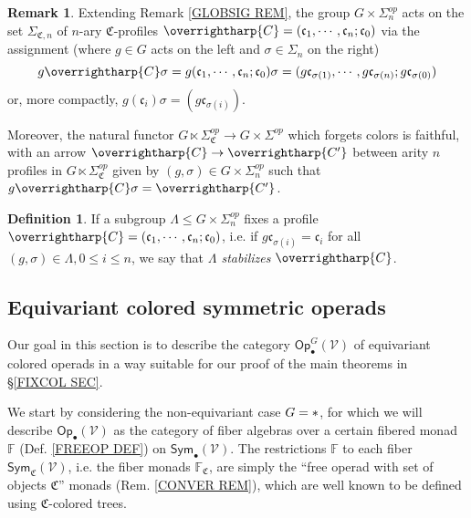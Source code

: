 \documentclass[a4paper,10pt
]{article}%
\numberwithin{equation}{section}
\numberwithin{figure}{section}
\theoremstyle{definition} %
\newtheorem{definition}[equation]{Definition}%
\newtheorem{remark}[equation]{Remark}%
\newcommand{\vect}[1]{\text{\overrightharp{\ensuremath{#1}}}}
\newcommand{\V}{\ensuremath{\mathcal V}}
\newcommand{\1}{\ensuremath{\mathbbm 1}}%
\begin{document}
\begin{remark}\label{SIGACT REM}
	Extending Remark \ref{GLOBSIG REM}, 
	the group $G \times \Sigma_n^{op}$
	acts on the set $\Sigma_{\mathfrak{C},n}$
	of $n$-ary $\mathfrak{C}$-profiles
	$\vect{C} = (\mathfrak{c}_1,\cdots,\mathfrak{c}_n;\mathfrak{c}_0)$
	via the assignment (where $g \in G$ acts on the left and $\sigma \in \Sigma_n$ on the right)
	\begin{equation}\label{SIGACT_EQ}
	g \vect{C} \sigma =
	g (\mathfrak{c}_1,\cdots,\mathfrak{c}_n;\mathfrak{c}_0) \sigma
	=
	(g\mathfrak{c}_{\sigma(1)},\cdots,g\mathfrak{c}_{\sigma(n)};g\mathfrak{c}_{\sigma(0)})
	\end{equation}
	or, more compactly, $g (\mathfrak{c}_i) \sigma = (g \mathfrak{c}_{\sigma(i)})$.
	
	Moreover, the natural functor 
	$G \ltimes \Sigma^{op}_{\mathfrak{C}}
	\to G \times \Sigma^{op}$
	which forgets colors is faithful,
	with an arrow
	$\vect{C} \to \vect{C'}$
	between arity $n$ profiles
	in $G \ltimes \Sigma_{\mathfrak{C}}^{op}$
	given by 
	$(g,\sigma) \in G \times \Sigma_n^{op}$
	such that
	$g \vect{C} \sigma = \vect{C'}$.
\end{remark}




\begin{definition}\label{STABS DEF}
	If a subgroup $\Lambda \leq G \times \Sigma_n^{op}$
	fixes a profile 
	$\vect{C} = (\mathfrak{c}_1,\cdots,\mathfrak{c}_n;\mathfrak{c}_0)$,
	i.e. if
	$g\mathfrak{c}_{\sigma(i)} = \mathfrak{c}_i$
	for all $(g, \sigma) \in \Lambda, 0 \leq i \leq n$,
	we say that \textit{$\Lambda$ stabilizes $\vect C$}. 
\end{definition}






\subsection{Equivariant colored symmetric operads}
\label{EQCOSYMOP SEC}




Our goal in this section is to describe the category 
$\mathsf{Op}^{G}_{\bullet}(\V)$
of equivariant colored operads in a way suitable for our 
proof of the main theorems in \S \ref{FIXCOL SEC}. %

We start by considering the non-equivariant case
$G = \**$,
for which we will describe
$\mathsf{Op}_{\bullet}(\V)$
as the category of fiber algebras over a certain fibered monad $\mathbb{F}$ (Def. \ref{FREEOP DEF}) on 
$\mathsf{Sym}_\bullet(\mathcal{V})$.
%
The restrictions $\mathbb{F}$ to each fiber
$\mathsf{Sym}_{\mathfrak{C}}(\V)$,
i.e. the fiber monads $\mathbb{F}_{\mathfrak{C}}$,
are simply the ``free operad with set of objects $\mathfrak{C}$'' monads (Rem. \ref{CONVER REM}),
which are well known to be defined using 
$\mathfrak{C}$-colored trees.
\end{document}
